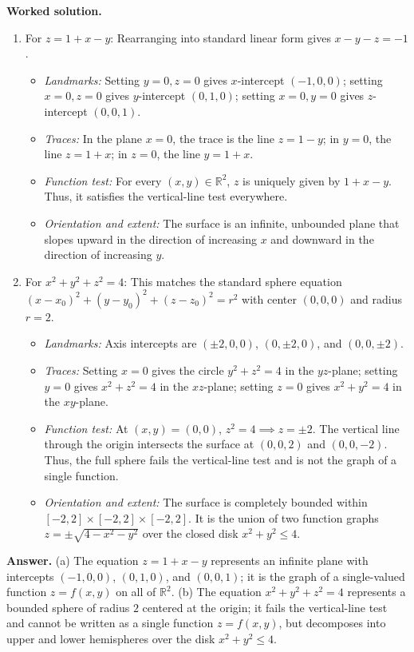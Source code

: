 \documentclass[11pt,letterpaper]{article}
\newcommand{\R}{\mathbb{R}}
\begin{document}
\textbf{Worked solution.}
\begin{enumerate}[label=(\alph*),leftmargin=*]
    \item For $z = 1 + x - y$:
    Rearranging into standard linear form gives $x - y - z = -1$.
    \begin{itemize}[nosep]
        \item \emph{Landmarks:} Setting $y=0, z=0$ gives $x$-intercept $(-1,0,0)$; setting $x=0, z=0$ gives $y$-intercept $(0,1,0)$; setting $x=0, y=0$ gives $z$-intercept $(0,0,1)$.
        \item \emph{Traces:} In the plane $x=0$, the trace is the line $z = 1 - y$; in $y=0$, the line $z = 1 + x$; in $z=0$, the line $y = 1 + x$.
        \item \emph{Function test:} For every $(x,y) \in \R^2$, $z$ is uniquely given by $1+x-y$. Thus, it satisfies the vertical-line test everywhere.
        \item \emph{Orientation and extent:} The surface is an infinite, unbounded plane that slopes upward in the direction of increasing $x$ and downward in the direction of increasing $y$.
    \end{itemize}
    \item For $x^2 + y^2 + z^2 = 4$:
    This matches the standard sphere equation $(x-x_0)^2 + (y-y_0)^2 + (z-z_0)^2 = r^2$ with center $(0,0,0)$ and radius $r = 2$.
    \begin{itemize}[nosep]
        \item \emph{Landmarks:} Axis intercepts are $(\pm 2, 0, 0)$, $(0, \pm 2, 0)$, and $(0, 0, \pm 2)$.
        \item \emph{Traces:} Setting $x=0$ gives the circle $y^2+z^2=4$ in the $yz$-plane; setting $y=0$ gives $x^2+z^2=4$ in the $xz$-plane; setting $z=0$ gives $x^2+y^2=4$ in the $xy$-plane.
        \item \emph{Function test:} At $(x,y)=(0,0)$, $z^2 = 4 \implies z = \pm 2$. The vertical line through the origin intersects the surface at $(0,0,2)$ and $(0,0,-2)$. Thus, the full sphere fails the vertical-line test and is not the graph of a single function.
        \item \emph{Orientation and extent:} The surface is completely bounded within $[-2,2] \times [-2,2] \times [-2,2]$. It is the union of two function graphs $z = \pm\sqrt{4-x^2-y^2}$ over the closed disk $x^2+y^2 \le 4$.
    \end{itemize}
\end{enumerate}

\textbf{Answer.}
(a) The equation $z = 1 + x - y$ represents an infinite plane with intercepts $(-1,0,0)$, $(0,1,0)$, and $(0,0,1)$; it is the graph of a single-valued function $z = f(x,y)$ on all of $\R^2$.
(b) The equation $x^2 + y^2 + z^2 = 4$ represents a bounded sphere of radius $2$ centered at the origin; it fails the vertical-line test and cannot be written as a single function $z = f(x,y)$, but decomposes into upper and lower hemispheres over the disk $x^2+y^2 \le 4$.
\end{document}
